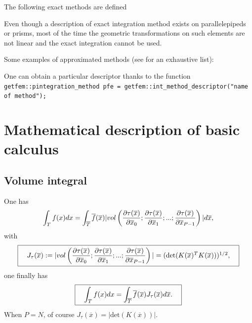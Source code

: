 \documentclass[11pt,a4paper]{article}
\begin{document}
The following exact methods are defined



Even though a description of exact integration method exists on parallelepipeds or prisms, most of the time the geometric transformations on such elements are not linear and the exact integration cannot be used.

Some examples of approximated methods (see \cite{FEM_LIST} for an exhaustive list):


One can obtain a particular descriptor thanks to the function
{\tt getfem::pintegration\_method pfe = getfem::int\_method\_descriptor("name of method"); }\\[0.5cm]


\section{Mathematical description of basic calculus}

\subsection{Volume integral}
One has
$$ \int_T f(x) dx = \int_{\overline{T}} \overline{f}(\overline{x}) |vol\left({\displaystyle \frac{\displaystyle \partial \tau(\overline{x})}{\displaystyle \partial \overline{x}_0}} ;{\displaystyle \frac{\displaystyle \partial \tau(\overline{x})}{\displaystyle \partial \overline{x}_1}}; ...; {\displaystyle \frac{\displaystyle \partial \tau(\overline{x})}{\displaystyle \partial \overline{x}_{P-1} }}\right)| d\overline{x}, $$
with
$$ \fbox{$\hspace{1em} J_{\tau}(\overline{x}) := |vol\left({\displaystyle \frac{\displaystyle \partial \tau(\overline{x})}{\displaystyle \partial \overline{x}_0}} ;{\displaystyle \frac{\displaystyle \partial \tau(\overline{x})}{\displaystyle \partial \overline{x}_1}}; ...; {\displaystyle \frac{\displaystyle \partial \tau(\overline{x})}{\displaystyle \partial \overline{x}_{P-1} }}\right)| = (\mbox{det}(K(\overline{x})^T K(\overline{x})))^{1/2},\hspace{1em}$} $$
one finally has
$$ \fbox{$\hspace{1em} \displaystyle \int_T f(x) dx = \int_{\overline{T}} \overline{f}(\overline{x})  J_{\tau}(\overline{x})d\overline{x}.\hspace{1em}$} $$
When $P = N$, of course $J_{\tau}(\overline{x}) = |\mbox{det}(K(\overline{x}))|$.
\end{document}

